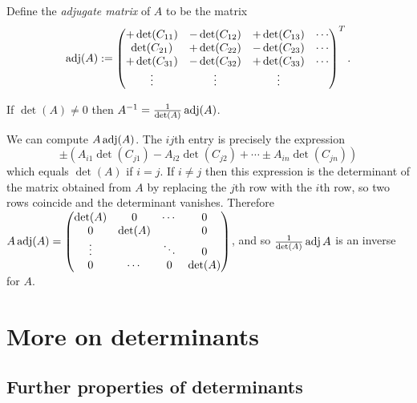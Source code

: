 \documentclass{article}
\begin{document}
\begin{Definition}
Define the {\em adjugate matrix} of \(A\) to be the matrix
\[\operatorname{adj}(A):=\begin{pmatrix} +\det(C_{11}) & -\det(C_{12}) & +\det(C_{13}) & \cdots
\\ \det(C_{21}) & +\det(C_{22}) & -\det(C_{23}) & \cdots
\\+\det(C_{31}) & -\det(C_{32}) & +\det(C_{33}) & \cdots \\ \vdots &
\vdots & \vdots & \end{pmatrix}^T.\]


\end{Definition}
\begin{Theorem}
If \(\det(A)\neq 0\) then \(A^{-1}=\frac{1}{\det(A)}\operatorname{adj}(A)\).
\end{Theorem}
\begin{Proof}
We can compute \(A \operatorname{adj}(A)\). The \(ij\)th entry is precisely the
expression \[\pm(A_{i1}\det(C_{j1})-A_{i2}\det(C_{j2})+\cdots\pm
A_{in}\det(C_{jn}))\] which equals \(\det(A)\) if \(i=j\). If
\(i\neq j\) then this expression is the determinant of the matrix
obtained from \(A\) by replacing the \(j\)th row with the \(i\)th
row, so two rows coincide and the determinant vanishes. Therefore
\(A \operatorname{adj}(A)=\begin{pmatrix} \det(A) & 0 & \cdots & 0 \\ 0 & \det(A) & &
0\\ \vdots & & \ddots & 0\\ 0 & \cdots & 0 & \det(A)\end{pmatrix}\), and so
\(\frac{1}{\det(A)}\operatorname{adj} A\) is an inverse for \(A\). \qedhere
\end{Proof}
\clearpage
\section{More on determinants}
\subsection{Further properties of determinants}
\end{document}
